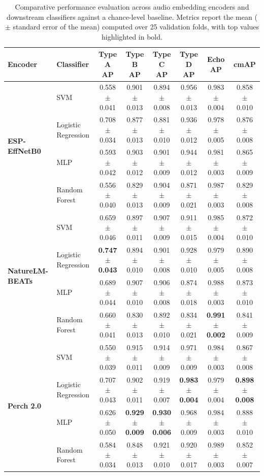 \begin{table}[htbp]
\centering
\caption{Comparative performance evaluation across audio embedding encoders and downstream classifiers against a chance-level baseline. Metrics report the mean ($\pm$ standard error of the mean) computed over 25 validation folds, with top values highlighted in bold.}
\label{tab:encoder_results}
\footnotesize
\def\arraystretch{1.2}
\setlength{\tabcolsep}{5pt}
\begin{tabular}{llcccccc}
\toprule
\textbf{Encoder} & \textbf{Classifier} & \textbf{Type A AP} & \textbf{Type B AP} & \textbf{Type C AP} & \textbf{Type D AP} & \textbf{Echo AP} & \textbf{cmAP} \\
\midrule
\multirow{4}{*}{\textbf{ESP-EffNetB0}} & SVM & 0.558 $\pm$ 0.041 & 0.901 $\pm$ 0.013 & 0.894 $\pm$ 0.008 & 0.956 $\pm$ 0.013 & 0.983 $\pm$ 0.004 & 0.858 $\pm$ 0.010 \\
 & Logistic Regression & 0.708 $\pm$ 0.034 & 0.877 $\pm$ 0.013 & 0.881 $\pm$ 0.010 & 0.936 $\pm$ 0.012 & 0.978 $\pm$ 0.005 & 0.876 $\pm$ 0.008 \\
 & MLP & 0.593 $\pm$ 0.042 & 0.903 $\pm$ 0.012 & 0.901 $\pm$ 0.009 & 0.944 $\pm$ 0.012 & 0.981 $\pm$ 0.003 & 0.865 $\pm$ 0.009 \\
 & Random Forest & 0.556 $\pm$ 0.040 & 0.829 $\pm$ 0.013 & 0.904 $\pm$ 0.009 & 0.871 $\pm$ 0.021 & 0.987 $\pm$ 0.003 & 0.829 $\pm$ 0.008 \\
\midrule
\multirow{4}{*}{\textbf{NatureLM-BEATs}} & SVM & 0.659 $\pm$ 0.046 & 0.897 $\pm$ 0.011 & 0.907 $\pm$ 0.009 & 0.911 $\pm$ 0.015 & 0.985 $\pm$ 0.004 & 0.872 $\pm$ 0.010 \\
 & Logistic Regression & \textbf{0.747 $\pm$ 0.043} & 0.894 $\pm$ 0.010 & 0.901 $\pm$ 0.008 & 0.928 $\pm$ 0.010 & 0.979 $\pm$ 0.005 & 0.890 $\pm$ 0.008 \\
 & MLP & 0.689 $\pm$ 0.044 & 0.907 $\pm$ 0.010 & 0.906 $\pm$ 0.008 & 0.874 $\pm$ 0.018 & 0.988 $\pm$ 0.003 & 0.873 $\pm$ 0.010 \\
 & Random Forest & 0.660 $\pm$ 0.041 & 0.830 $\pm$ 0.013 & 0.892 $\pm$ 0.010 & 0.834 $\pm$ 0.021 & \textbf{0.991 $\pm$ 0.002} & 0.841 $\pm$ 0.009 \\
\midrule
\multirow{4}{*}{\textbf{Perch 2.0}} & SVM & 0.550 $\pm$ 0.039 & 0.915 $\pm$ 0.011 & 0.914 $\pm$ 0.009 & 0.971 $\pm$ 0.009 & 0.984 $\pm$ 0.003 & 0.867 $\pm$ 0.008 \\
 & Logistic Regression & 0.707 $\pm$ 0.043 & 0.902 $\pm$ 0.011 & 0.919 $\pm$ 0.007 & \textbf{0.983 $\pm$ 0.004} & 0.979 $\pm$ 0.004 & \textbf{0.898 $\pm$ 0.008} \\
 & MLP & 0.626 $\pm$ 0.050 & \textbf{0.929 $\pm$ 0.009} & \textbf{0.930 $\pm$ 0.006} & 0.968 $\pm$ 0.009 & 0.984 $\pm$ 0.003 & 0.888 $\pm$ 0.010 \\
 & Random Forest & 0.584 $\pm$ 0.034 & 0.848 $\pm$ 0.013 & 0.921 $\pm$ 0.010 & 0.920 $\pm$ 0.017 & 0.989 $\pm$ 0.003 & 0.852 $\pm$ 0.007 \\
\bottomrule
\end{tabular}
\end{table}